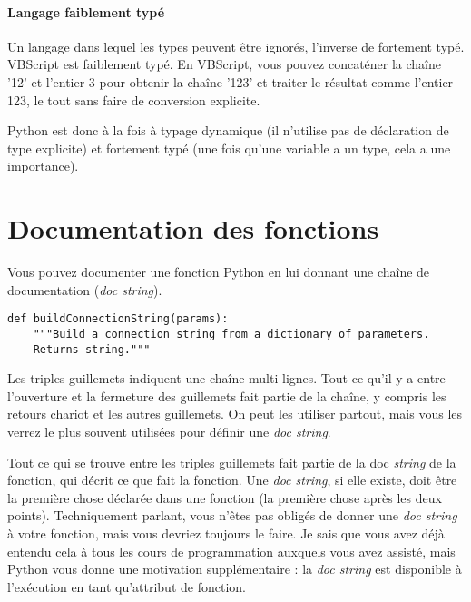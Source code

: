 \paragraph*{Langage faiblement typé}
Un langage dans lequel les types peuvent être ignorés, l'inverse de fortement typé. VBScript est faiblement typé. En VBScript, vous pouvez concaténer la chaîne '12' et l'entier 3 pour obtenir la chaîne '123' et  traiter le résultat comme l'entier 123, le tout sans faire de conversion explicite.

\medskip
Python est donc à la fois à typage dynamique (il n'utilise pas de déclaration de type explicite) et fortement typé (une fois qu'une variable a un type, cela a une importance).

\section*{Documentation des fonctions}
Vous pouvez documenter une fonction Python en lui donnant une chaîne de documentation (\emph{doc string}).

\begin{example}
\begin{lstlisting}
def buildConnectionString(params):
    """Build a connection string from a dictionary of parameters.
    Returns string."""
\end{lstlisting}
\end{example}

Les triples guillemets indiquent une chaîne multi-lignes. Tout ce qu'il y a entre l'ouverture et la fermeture des guillemets fait partie de la chaîne, y compris les retours chariot et les autres guillemets. On peut les utiliser partout, mais vous les verrez le plus souvent utilisées pour définir une \emph{doc string}.


Tout ce qui se trouve entre les triples guillemets fait partie de la doc \emph{string} de la fonction, qui décrit ce que fait la fonction. Une \emph{doc string}, si elle existe, doit être la première chose déclarée dans une fonction (la première chose après les deux points). Techniquement parlant, vous n'êtes pas obligés de donner une \emph{doc string} à votre fonction, mais vous devriez toujours le faire. Je sais que vous avez déjà entendu cela à tous les cours de programmation auxquels vous avez assisté, mais Python vous donne une motivation supplémentaire : la \emph{doc string} est disponible à l'exécution en tant qu'attribut de fonction.

